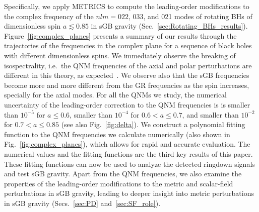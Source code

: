 \documentclass[aps,prx,amsmath,floats,floatfix,twocolumn,
  superscriptaddress,nofootinbib,showpacs]{revtex4-1}
\begin{document}
Specifically, we apply METRICS to compute the leading-order modifications to the complex frequency of the $nlm=022$, 033, and 021 modes of rotating BHs of dimensionless spin $a \lesssim 0.85$ in sGB gravity (Sec.~\ref{sec:Rotating_BHs_results}). 
Figure~\ref{fig:complex_planes} presents a summary of our results through the trajectories of the frequencies in the complex plane for a sequence of black holes with different dimensionless spins. We immediately observe the breaking of isospectrality, i.e.~the QNM frequencies of the axial and polar perturbations are different in this theory, as expected~\cite{Manfredi:2017xcv, Chen:2021cts, QNM_dCS_01, QNM_dCS_02, QNM_dCS_03, QNM_dCS_04, QNM_EdGB_01, QNM_EdGB_02, QNM_EdGB_03}. 
We observe also that the sGB frequencies become more and more different from the GR frequencies as the spin increases, specially for the axial modes. 
For all the QNMs we study, the numerical uncertainty of the leading-order correction to the QNM frequencies is 
is smaller than $10^{-5}$ for $a \leq 0.6$, smaller than $10^{-4} $ for $0.6< a \leq 0.7$, and smaller than $10^{-2} $ for $0.7< a \leq 0.85$ (see also Fig.~\ref{fig:delta}). 
We construct a polynomial fitting function to the QNM frequencies we calculate numerically (also shown in Fig.~\ref{fig:complex_planes}), which allows for rapid and accurate evaluation.
The numerical values and the fitting functions are the third key results of this paper. 
These fitting functions can now be used to analyze the detected ringdown signals and test sGB gravity. 
Apart from the QNM frequencies, we also examine the properties of the leading-order modifications to the metric and scalar-field perturbations in sGB gravity, leading to deeper insight into metric perturbations in sGB gravity (Secs.~\ref{sec:PD} and~\ref{sec:SF_role}). 
\end{document}
